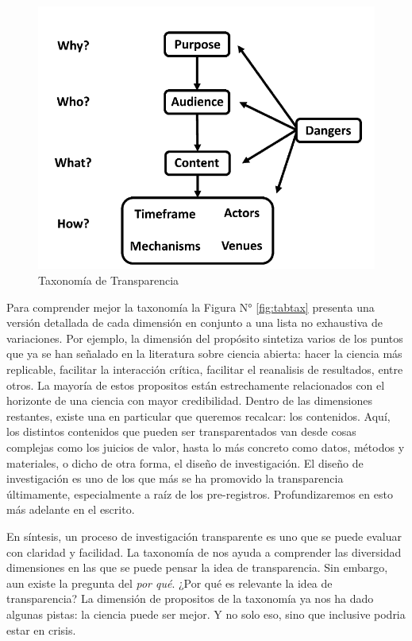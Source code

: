 \documentclass[
]{book}
\begin{document}
\begin{figure}

{\centering \includegraphics[width=1\linewidth]{docs/images/taxonomy} 

}

\caption{Taxonomía de Transparencia}\label{fig:taxonomy}
\end{figure}

Para comprender mejor la taxonomía la Figura N° \ref{fig:tabtax} presenta una versión detallada de cada dimensión en conjunto a una lista no exhaustiva de variaciones. Por ejemplo, la dimensión del propósito sintetiza varios de los puntos que ya se han señalado en la literatura sobre ciencia abierta: hacer la ciencia más replicable, facilitar la interacción crítica, facilitar el reanalisis de resultados, entre otros. La mayoría de estos propositos están estrechamente relacionados con el horizonte de una ciencia con mayor credibilidad. Dentro de las dimensiones restantes, existe una en particular que queremos recalcar: los contenidos. Aquí, los distintos contenidos que pueden ser transparentados van desde cosas complejas como los juicios de valor, hasta lo más concreto como datos, métodos y materiales, o dicho de otra forma, el diseño de investigación. El diseño de investigación es uno de los que más se ha promovido la transparencia últimamente, especialmente a raíz de los pre-registros. Profundizaremos en esto más adelante en el escrito.

En síntesis, un proceso de investigación transparente es uno que se puede evaluar con claridad y facilidad. La taxonomía de \citet{elliott_Taxonomy_2020} nos ayuda a comprender las diversidad dimensiones en las que se puede pensar la idea de transparencia. Sin embargo, aun existe la pregunta del \emph{por qué}. ¿Por qué es relevante la idea de transparencia? La dimensión de propositos de la taxonomía ya nos ha dado algunas pistas: la ciencia puede ser mejor. Y no solo eso, sino que inclusive podria estar en crisis.
\end{document}

